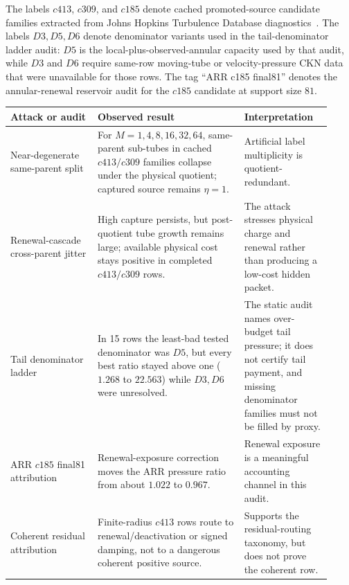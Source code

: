 \documentclass[11pt]{article}
\begin{document}
The labels \(c413\), \(c309\), and \(c185\) denote cached promoted-source
candidate families extracted from Johns Hopkins Turbulence Database
diagnostics~\cite{JHTDB2008,JHTDB2007}.  The labels \(D3,D5,D6\) denote
denominator variants used in the tail-denominator ladder audit: \(D5\) is the
local-plus-observed-annular
capacity used by that audit, while \(D3\) and \(D6\) require same-row
moving-tube or velocity-pressure CKN data that were unavailable for those
rows.  The tag ``ARR c185 final81'' denotes the annular-renewal reservoir audit
for the \(c185\) candidate at support size \(81\).

\begin{center}
\scriptsize
\begin{tabular}{@{}p{0.25\linewidth}p{0.42\linewidth}p{0.25\linewidth}@{}}
\toprule
\textbf{Attack or audit} & \textbf{Observed result} & \textbf{Interpretation} \\
\midrule
Near-degenerate same-parent split &
For \(M=1,4,8,16,32,64\), same-parent sub-tubes in cached \(c413/c309\)
families collapse under the physical quotient; captured source remains
\(\eta=1\). &
Artificial label multiplicity is quotient-redundant. \\
\addlinespace
Renewal-cascade cross-parent jitter &
High capture persists, but post-quotient tube growth remains large; available
physical cost stays positive in completed \(c413/c309\) rows. &
The attack stresses physical charge and renewal rather than producing a
low-cost hidden packet. \\
\addlinespace
Tail denominator ladder &
In 15 rows the least-bad tested denominator was \(D5\), but every best ratio
stayed above one (\(1.268\) to \(22.563\)) while \(D3,D6\) were
unresolved.\footnotemark &
The static audit names over-budget tail pressure; it does not certify tail
payment, and missing denominator families must not be filled by proxy. \\
\addlinespace
ARR \(c185\) final81 attribution &
Renewal-exposure correction moves the ARR pressure ratio from about \(1.022\) to
\(0.967\). &
Renewal exposure is a meaningful accounting channel in this audit. \\
\addlinespace
Coherent residual attribution &
Finite-radius \(c413\) rows route to renewal/deactivation or signed damping,
not to a dangerous coherent positive source. &
Supports the residual-routing taxonomy, but does not prove the coherent row. \\
\bottomrule
\end{tabular}
\end{center}
\end{document}

